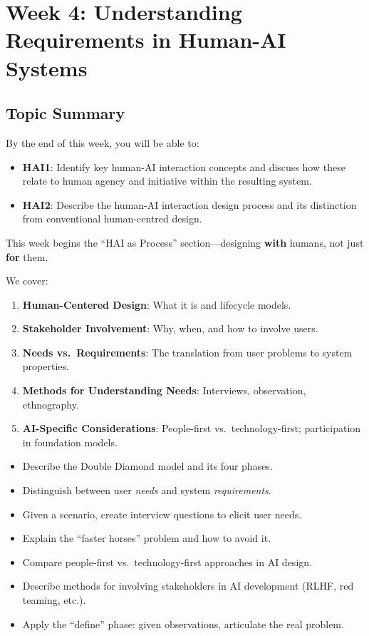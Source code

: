 \section{Week 4: Understanding Requirements in Human-AI Systems}

\subsection{Topic Summary}

\begin{keybox}
By the end of this week, you will be able to:
\begin{itemize}
  \item \textbf{HAI1}: Identify key human-AI interaction concepts and discuss how these relate to human agency and initiative within the resulting system.
  \item \textbf{HAI2}: Describe the human-AI interaction design process and its distinction from conventional human-centred design.
\end{itemize}
\end{keybox}

\begin{keybox}
This week begins the ``HAI as Process'' section---designing \textbf{with} humans, not just \textbf{for} them.

We cover:
\begin{enumerate}
  \item \textbf{Human-Centered Design}: What it is and lifecycle models.
  \item \textbf{Stakeholder Involvement}: Why, when, and how to involve users.
  \item \textbf{Needs vs.\ Requirements}: The translation from user problems to system properties.
  \item \textbf{Methods for Understanding Needs}: Interviews, observation, ethnography.
  \item \textbf{AI-Specific Considerations}: People-first vs.\ technology-first; participation in foundation models.
\end{enumerate}
\end{keybox}

\begin{keybox}
\begin{itemize}
  \item Describe the Double Diamond model and its four phases.
  \item Distinguish between user \textit{needs} and system \textit{requirements}.
  \item Given a scenario, create interview questions to elicit user needs.
  \item Explain the ``faster horses'' problem and how to avoid it.
  \item Compare people-first vs.\ technology-first approaches in AI design.
  \item Describe methods for involving stakeholders in AI development (RLHF, red teaming, etc.).
  \item Apply the ``define'' phase: given observations, articulate the real problem.
\end{itemize}
\end{keybox}

